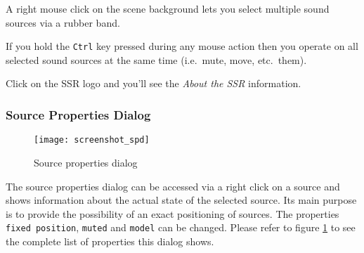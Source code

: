 A right mouse click on the scene background lets you select multiple
sound sources via a rubber band.

If you hold the \texttt{Ctrl} key pressed during any mouse action then you
operate on all selected sound sources at the same time (i.e.~mute,
move, etc.~them).

Click on the SSR logo and you'll see the \emph{About the SSR}
information.

\subsubsection{Source Properties Dialog}
\label{sec:source_properties_dialog}

\begin{figure}
\begin{center}
\texttt{[image: screenshot\_spd]}
\caption{\label{fig:screenshot_spd}{Source properties dialog}}
\end{center}
\end{figure}

The source properties dialog can be accessed via a right click on a source and 
shows information about the actual state of the selected source. Its main 
purpose is to provide the possibility of an exact positioning of sources. The 
properties \texttt{fixed position}, \texttt{muted} and \texttt{model} can be 
changed. Please refer to figure \ref{fig:screenshot_spd} to see the complete 
list of properties this dialog shows. 

